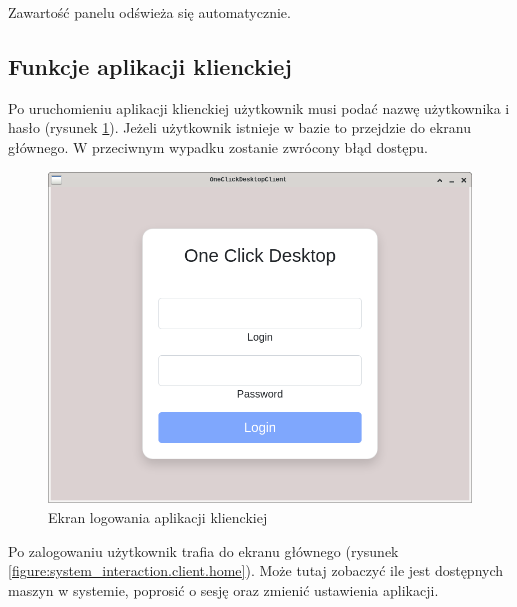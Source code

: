 \documentclass[../opis-rozwiazania.tex]{subfiles}
\begin{document}
Zawartość panelu odświeża się automatycznie.

\newpage
\subsection{Funkcje aplikacji klienckiej}

Po uruchomieniu aplikacji klienckiej użytkownik musi podać nazwę użytkownika i hasło (rysunek \ref{figure:system_interaction.client.login}).
Jeżeli użytkownik istnieje w bazie to przejdzie do ekranu głównego.
W przeciwnym wypadku zostanie zwrócony błąd dostępu.

\begin{figure}[ht!]
  \centering
  \includegraphics[width=\textwidth]{resources/client_login.png}
  \caption{Ekran logowania aplikacji klienckiej}
  \label{figure:system_interaction.client.login}
\end{figure}

Po zalogowaniu użytkownik trafia do ekranu głównego (rysunek \ref{figure:system_interaction.client.home}).
Może tutaj zobaczyć ile jest dostępnych maszyn w systemie, poprosić o sesję oraz zmienić ustawienia aplikacji.
\end{document}
